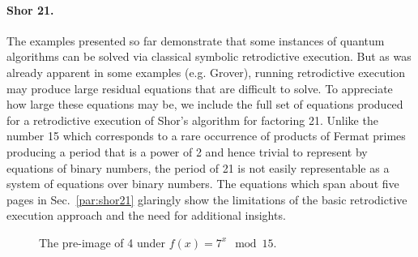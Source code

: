 \documentclass{article}
\begin{document}
\paragraph*{Shor 21.} 
The examples presented so far demonstrate that some instances of
quantum algorithms can be solved via classical symbolic retrodictive
execution. But as was already apparent in some examples (e.g. Grover),
running retrodictive execution may produce large residual equations
that are difficult to solve. To appreciate how large these equations
may be, we include the full set of equations produced for a
retrodictive execution of Shor's algorithm for factoring 21. Unlike
the number 15 which corresponds to a rare occurrence of products of
Fermat primes producing a period that is a power of 2 and hence
trivial to represent by equations of binary numbers, the period of 21
is not easily representable as a system of equations over binary
numbers. The equations which span about five pages in
Sec.~\ref{par:shor21} glaringly show the limitations of the basic
retrodictive execution approach and the need for additional insights.

\begin{wrapfigure}{r}{5cm}
\begin{center}
\end{center}
\caption{\label{fig:preimage}The pre-image of 4 under $f(x) = 7^x \mod 15$.}
\end{wrapfigure}
\end{document}

